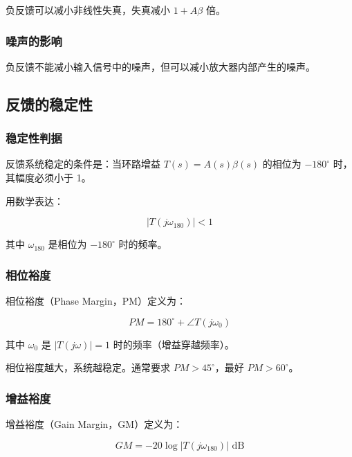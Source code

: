 负反馈可以减小非线性失真，失真减小 $1 + A\beta$ 倍。

\subsubsection{噪声的影响}

负反馈不能减小输入信号中的噪声，但可以减小放大器内部产生的噪声。

\subsection{反馈的稳定性}

\subsubsection{稳定性判据}

反馈系统稳定的条件是：当环路增益 $T(s) = A(s)\beta(s)$ 的相位为 $-180^\circ$ 时，其幅度必须小于 1。

用数学表达：

\begin{equation}
|T(j\omega_{180})| < 1 \label{eq:stability-criterion}
\end{equation}

其中 $\omega_{180}$ 是相位为 $-180^\circ$ 时的频率。

\subsubsection{相位裕度}

相位裕度（Phase Margin，PM）定义为：

\begin{equation}
PM = 180^\circ + \angle T(j\omega_0) \label{eq:phase-margin}
\end{equation}

其中 $\omega_0$ 是 $|T(j\omega)| = 1$ 时的频率（增益穿越频率）。

相位裕度越大，系统越稳定。通常要求 $PM > 45^\circ$，最好 $PM > 60^\circ$。

\subsubsection{增益裕度}

增益裕度（Gain Margin，GM）定义为：

\begin{equation}
GM = -20\log|T(j\omega_{180})| \text{ dB} \label{eq:gain-margin}
\end{equation}

